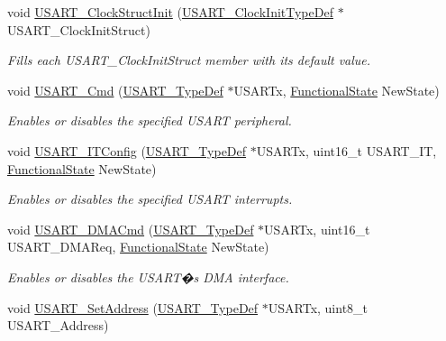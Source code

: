 \begin{DoxyCompactItemize}
void \hyperlink{group___u_s_a_r_t___private___functions_ga59df27d0adda18b16ee28d47672cc724}{U\+S\+A\+R\+T\+\_\+\+Clock\+Struct\+Init} (\hyperlink{struct_u_s_a_r_t___clock_init_type_def}{U\+S\+A\+R\+T\+\_\+\+Clock\+Init\+Type\+Def} $\ast$U\+S\+A\+R\+T\+\_\+\+Clock\+Init\+Struct)
\begin{DoxyCompactList}\small\item\em Fills each U\+S\+A\+R\+T\+\_\+\+Clock\+Init\+Struct member with its default value. \end{DoxyCompactList}\item 
void \hyperlink{group___u_s_a_r_t___private___functions_ga45e51626739c5f22a6567c8a85d1d85e}{U\+S\+A\+R\+T\+\_\+\+Cmd} (\hyperlink{struct_u_s_a_r_t___type_def}{U\+S\+A\+R\+T\+\_\+\+Type\+Def} $\ast$U\+S\+A\+R\+Tx, \hyperlink{group___exported__types_gac9a7e9a35d2513ec15c3b537aaa4fba1}{Functional\+State} New\+State)
\begin{DoxyCompactList}\small\item\em Enables or disables the specified U\+S\+A\+RT peripheral. \end{DoxyCompactList}\item 
void \hyperlink{group___u_s_a_r_t___private___functions_ga6d8f2dd1f34060ae7e386e3e5d56b6f6}{U\+S\+A\+R\+T\+\_\+\+I\+T\+Config} (\hyperlink{struct_u_s_a_r_t___type_def}{U\+S\+A\+R\+T\+\_\+\+Type\+Def} $\ast$U\+S\+A\+R\+Tx, uint16\+\_\+t U\+S\+A\+R\+T\+\_\+\+IT, \hyperlink{group___exported__types_gac9a7e9a35d2513ec15c3b537aaa4fba1}{Functional\+State} New\+State)
\begin{DoxyCompactList}\small\item\em Enables or disables the specified U\+S\+A\+RT interrupts. \end{DoxyCompactList}\item 
void \hyperlink{group___u_s_a_r_t___private___functions_ga902857f199ebfba21c63d725354af66f}{U\+S\+A\+R\+T\+\_\+\+D\+M\+A\+Cmd} (\hyperlink{struct_u_s_a_r_t___type_def}{U\+S\+A\+R\+T\+\_\+\+Type\+Def} $\ast$U\+S\+A\+R\+Tx, uint16\+\_\+t U\+S\+A\+R\+T\+\_\+\+D\+M\+A\+Req, \hyperlink{group___exported__types_gac9a7e9a35d2513ec15c3b537aaa4fba1}{Functional\+State} New\+State)
\begin{DoxyCompactList}\small\item\em Enables or disables the U\+S\+A\+R\+T�s D\+MA interface. \end{DoxyCompactList}\item 
void \hyperlink{group___u_s_a_r_t___private___functions_ga65ec9928817f3f031dd9a4dfc95d6666}{U\+S\+A\+R\+T\+\_\+\+Set\+Address} (\hyperlink{struct_u_s_a_r_t___type_def}{U\+S\+A\+R\+T\+\_\+\+Type\+Def} $\ast$U\+S\+A\+R\+Tx, uint8\+\_\+t U\+S\+A\+R\+T\+\_\+\+Address)

\end{DoxyCompactItemize}
